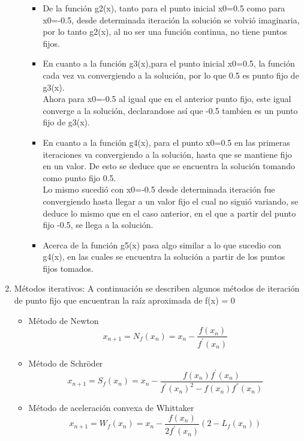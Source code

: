 \documentclass{udpreport}
\begin{document}
\begin{enumerate}
\begin{enumerate}
\begin{itemize}
\item De la función g2(x), tanto para el punto inicial x0=0.5 como para x0=-0.5, desde determinada iteración la solución se volvió imaginaria, por lo tanto g2(x), al no ser una función continua, no tiene puntos fijos.
\item En cuanto a la función g3(x),para el punto inicial x0=0.5, la función cada vez va convergiendo a la solución, por lo que 0.5 es punto fijo de g3(x).\\ Ahora para x0=-0.5 al igual que en el anterior punto fijo, este igual converge a la solución, declarandose así que -0.5 tambien es un punto fijo de g3(x).
\item En cuanto a la función g4(x), para el punto x0=0.5 en las primeras iteraciones va convergiendo a la solución, hasta que se mantiene fijo en un valor. De esto se deduce que se encuentra la solución tomando como punto fijo 0.5.\\
Lo mismo sucedió con x0=-0.5 desde determinada iteración fue convergiendo hasta llegar a un valor fijo el cual no siguió variando, se deduce lo mismo que en el caso anterior, en el que a partir del punto fijo -0.5, se llega a la solución.
\item Acerca de la función g5(x) pasa algo similar a lo que sucedio con g4(x), en las cuales se encuentra la solución a partir de los puntos fijos tomados.
\end{itemize}

\end{enumerate}

\item Métodos iterativos: A continuación se describen algunos métodos de iteración de punto fijo que encuentran la raíz aproximada de f(x) = 0
\begin{itemize}
        \item Método de Newton     
            \begin{equation*}
                 x_{n+1}=N_f(x_n)=x_n -  \frac{f(x_n)}{f^{'}(x_n)}
            \end{equation*}
        
        \item Método de Schröder
            \begin{equation*}
                x_{n+1}=S_f(x_n)=x_n-\frac{f(x_n)f^{'}(x_n)}{f^{'}(x_n)^{2}-f(x_n)f^{''}(x_n)}
            \end{equation*}
        
        \item Método de aceleración convexa de Whittaker
            \begin{equation*}
                x_{n+1}=W_f(x_n)=x_n - \frac{f(x_n)}{2f^{'}(x_n)}(2 - L_f(x_n))
            \end{equation*}
        

\end{itemize}
\end{enumerate}
\end{document}
